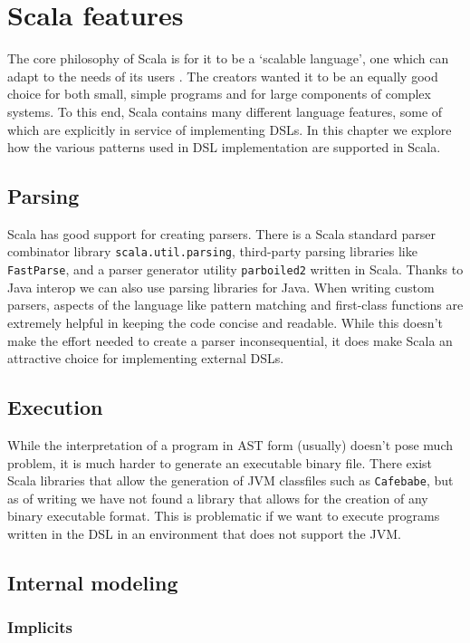 \chapter{Scala features}
The core philosophy of Scala is for it to be a `scalable language', one which can adapt to the needs of its users \autocite{Odersky:2004}.
The creators wanted it to be an equally good choice for both small, simple programs and for large components of complex systems.
To this end, Scala contains many different language features, some of which are explicitly in service of implementing DSLs.
In this chapter we explore how the various patterns used in DSL implementation are supported in Scala.

\section{Parsing}

Scala has good support for creating parsers.
There is a Scala standard parser combinator library \texttt{scala.util.parsing}, third-party parsing libraries like \texttt{FastParse}, and a parser generator utility \texttt{parboiled2} written in Scala.
Thanks to Java interop we can also use parsing libraries for Java.
When writing custom parsers, aspects of the language like pattern matching and first-class functions are extremely helpful in keeping the code concise and readable.
While this doesn't make the effort needed to create a parser inconsequential, it does make Scala an attractive choice for implementing external DSLs.

\section{Execution}

While the interpretation of a program in AST form  (usually) doesn't pose much problem, it is much harder to generate an executable binary file.
There exist Scala libraries that allow the generation of JVM classfiles such as \texttt{Cafebabe}, but as of writing we have not found a library that allows for the creation of any binary executable format.
This is problematic if we want to execute programs written in the DSL in an environment that does not support the JVM.

\section{Internal modeling}

\subsection{Implicits}

